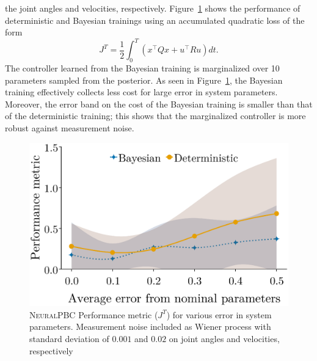 \begin{enumerate}
    the joint angles and velocities, respectively. 
    Figure~\ref{fig:comparison_neuralpbc} shows the performance of deterministic and
    Bayesian trainings using an accumulated quadratic loss of the form
    \begin{equation} J^T = \frac{1}{2}\int_0^T \left(x^\top Qx + u^\top Ru \right) dt.
    \label{eq:performance_metric} \end{equation}
    The controller learned from the Bayesian training is marginalized over 10
    parameters sampled from the posterior.
    As seen in Figure~\ref{fig:comparison_neuralpbc}, the Bayesian training
    effectively collects less cost for large error in system parameters.
    Moreover, the error band on the cost of the Bayesian training is smaller than
    that of the deterministic training; this shows that the marginalized controller
    is more robust against measurement noise.
    \begin{figure}
        \centering
        \includegraphics[clip,width=0.7\linewidth]{./figures/bandplot2.eps}%
        \caption{\textsc{NeuralPBC} Performance metric ($J^T$) for various
        error in system parameters. Measurement noise included as Wiener process
        with standard deviation of $0.001$ and $0.02$ on joint angles and
        velocities, respectively}
        \label{fig:comparison_neuralpbc}
    \end{figure}


\end{enumerate}
